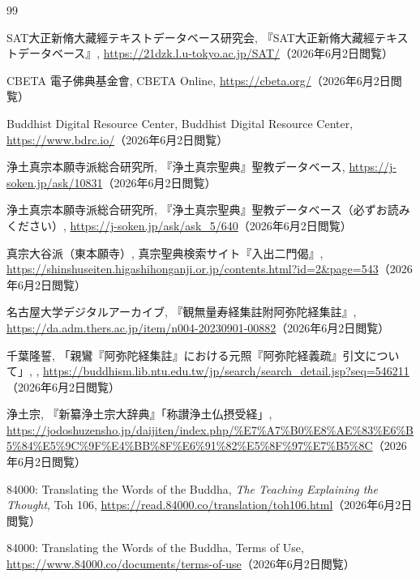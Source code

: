 \documentclass[uplatex,dvipdfmx,11pt,a4paper]{jsarticle}
\begin{document}
\begin{thebibliography}{99}

SAT大正新脩大藏經テキストデータベース研究会,
\newblock 『SAT大正新脩大藏經テキストデータベース』,
\newblock \url{https://21dzk.l.u-tokyo.ac.jp/SAT/}（2026年6月2日閲覧）

CBETA 電子佛典基金會,
\newblock CBETA Online,
\newblock \url{https://cbeta.org/}（2026年6月2日閲覧）

Buddhist Digital Resource Center,
\newblock Buddhist Digital Resource Center,
\newblock \url{https://www.bdrc.io/}（2026年6月2日閲覧）

浄土真宗本願寺派総合研究所,
\newblock 『浄土真宗聖典』聖教データベース,
\newblock \url{https://j-soken.jp/ask/10831}（2026年6月2日閲覧）

浄土真宗本願寺派総合研究所,
\newblock 『浄土真宗聖典』聖教データベース（必ずお読みください）,
\newblock \url{https://j-soken.jp/ask/ask_5/640}（2026年6月2日閲覧）

真宗大谷派（東本願寺）,
\newblock 真宗聖典検索サイト『入出二門偈』,
\newblock \url{https://shinshuseiten.higashihonganji.or.jp/contents.html?id=2&page=543}（2026年6月2日閲覧）

名古屋大学デジタルアーカイブ,
\newblock 『観無量寿経集註附阿弥陀経集註』,
\newblock \url{https://da.adm.thers.ac.jp/item/n004-20230901-00882}（2026年6月2日閲覧）

千葉隆誓,
\newblock 「親鸞『阿弥陀経集註』における元照『阿弥陀経義疏』引文について」,
,
\newblock \url{https://buddhism.lib.ntu.edu.tw/jp/search/search_detail.jsp?seq=546211}（2026年6月2日閲覧）

浄土宗,
\newblock 『新纂浄土宗大辞典』「称讃浄土仏摂受経」,
\newblock \url{https://jodoshuzensho.jp/daijiten/index.php/%E7%A7%B0%E8%AE%83%E6%B5%84%E5%9C%9F%E4%BB%8F%E6%91%82%E5%8F%97%E7%B5%8C}（2026年6月2日閲覧）

84000: Translating the Words of the Buddha,
\newblock \textit{The Teaching Explaining the Thought}, Toh 106,
\newblock \url{https://read.84000.co/translation/toh106.html}（2026年6月2日閲覧）

84000: Translating the Words of the Buddha,
\newblock Terms of Use,
\newblock \url{https://www.84000.co/documents/terms-of-use}（2026年6月2日閲覧）


\end{thebibliography}
\end{document}
